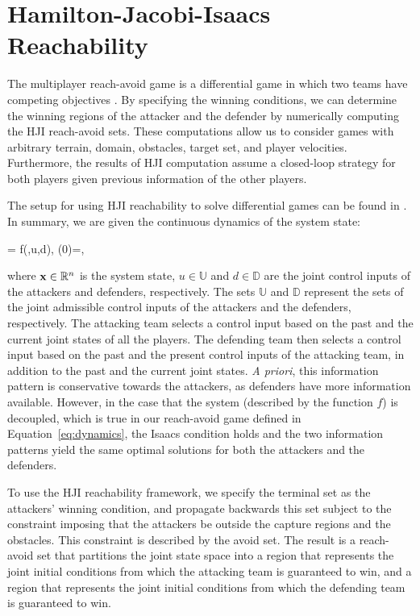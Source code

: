 \section{Hamilton-Jacobi-Isaacs Reachability} \label{sec:hj_background}
The multiplayer reach-avoid game is a differential game in which two teams have competing objectives \cite{b:basar-olsder-1999}. By specifying the winning conditions, we can determine the winning regions of the attacker and the defender by numerically computing the HJI reach-avoid sets. These computations allow us to consider games with arbitrary terrain, domain, obstacles, target set, and player velocities. Furthermore, the results of HJI computation assume a closed-loop strategy for both players given previous information of the other players.

The setup for using HJI reachability to solve differential games can be found in \cite{j:mitchell-TAC-2005, LSToolbox, Huang2011, Chen2014}. In summary, we are given the continuous dynamics of the system state:

\bq
\dxj = f(\xj,u,d), \xj(0)=\xjn,
\eq

\noindent where $\mathbf{x}\in\mathbb{R}^n$ is the system state, $u\in\mathbb{U}$ and $d\in\mathbb{D}$ are the joint control inputs of the attackers and defenders, respectively. The sets $\mathbb{U}$ and $\mathbb{D}$ represent the sets of the joint admissible control inputs of the attackers and the defenders, respectively. The attacking team selects a control input based on the past and the current joint states of all the players. The defending team then selects a control input based on the past and the present control inputs of the attacking team, in addition to
the past and the current joint states. \textit{A priori}, this information pattern is conservative towards the attackers, as defenders have more information available. However, in the case that the system (described by the function $f$) is decoupled, which is true in our reach-avoid game defined in Equation~\eqref{eq:dynamics}, the Isaacs condition \cite{b:isaacs-1967} holds and the two information patterns yield the same optimal solutions for both the attackers and the defenders.

To use the HJI reachability framework, we specify the terminal set as the attackers' winning condition, and propagate backwards this set subject to the constraint imposing that the attackers be outside the capture regions and the obstacles. This constraint is described by the avoid set. The result is a reach-avoid set that partitions the joint state space into a region that represents the joint initial conditions from which the attacking team is guaranteed to win, and a region that represents the joint initial conditions from which the defending team is guaranteed to win.

